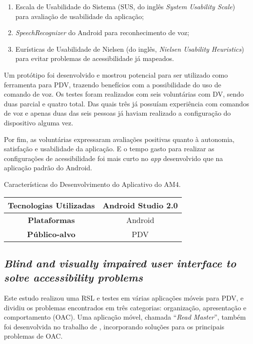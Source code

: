 \begin{enumerate}
  \item Escala de Usabilidade do Sistema (SUS, do inglês \emph{System Usability Scale}) para avaliação de usabilidade da aplicação;
  \item \emph{SpeechRecognizer} do Android para reconhecimento de voz;
  \item Eurísticas de Usabilidade de Nielsen (do inglês, \emph{Nielsen Usability Heuristics}) para evitar problemas de acessibilidade já mapeados.
\end{enumerate}

Um protótipo foi desenvolvido e mostrou potencial para ser utilizado como ferramenta para PDV, trazendo benefícios com a possibilidade do uso de comando de voz.
Os testes foram realizados com seis voluntárias com DV, sendo duas parcial e quatro total.
Das quais três já possuíam experiência com comandos de voz e apenas duas das seis pessoas já haviam realizado a configuração do dispositivo alguma vez.

Por fim, as voluntárias expressaram avaliações positivas quanto à autonomia, satisfação e usabilidade da aplicação.
E o tempo gasto para realizar as configurações de acessibilidade foi mais curto no \emph{app} desenvolvido que na aplicação padrão do Android.

\begin{quadro}[htb!]
  \caption{\label{qua-car-am4}Características do Desenvolvimento do Aplicativo do AM4.}
  \begin{tabular}{|c|c|}
    \hline
    \textbf{Tecnologias Utilizadas} & Android Studio 2.0 \\ \hline
    \textbf{Plataformas}            & Android            \\ \hline
    \textbf{Público-alvo}           & PDV                \\
    \hline
  \end{tabular}
\end{quadro}

\subsection{\emph{Blind and visually impaired user interface to solve accessibility problems}}

Este estudo realizou uma RSL e testes em várias aplicações móveis para PDV, e dividiu os problemas encontrados em três categorias: organização, apresentação e comportamento (OAC).
Uma aplicação móvel, chamada ``\emph{Read Master}'', também foi desenvolvida no trabalho de , incorporando soluções para os principais problemas de OAC\@.

